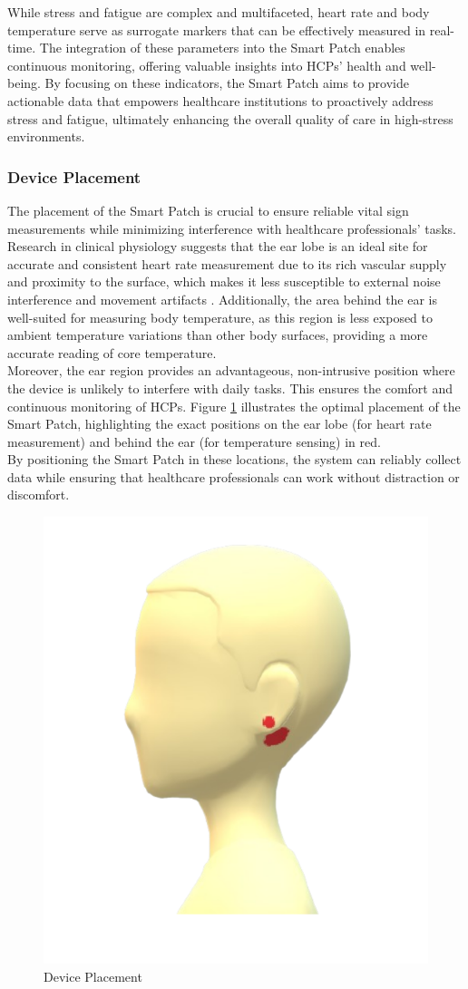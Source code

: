  \noindent While stress and fatigue are complex and multifaceted, heart rate and body temperature serve as surrogate markers that can be effectively measured in real-time. The integration of these parameters into the Smart Patch enables continuous monitoring, offering valuable insights into HCPs’ health and well-being. By focusing on these indicators, the Smart Patch aims to provide actionable data that empowers healthcare institutions to proactively address stress and fatigue, ultimately enhancing the overall quality of care in high-stress environments.
 
 \subsubsection{Device Placement}
The placement of the Smart Patch is crucial to ensure reliable vital sign measurements while minimizing interference with healthcare professionals' tasks. Research in clinical physiology suggests that the ear lobe is an ideal site for accurate and consistent heart rate measurement due to its rich vascular supply and proximity to the surface, which makes it less susceptible to external noise interference and movement artifacts . Additionally, the area behind the ear is well-suited for measuring body temperature, as this region is less exposed to ambient temperature variations than other body surfaces, providing a more accurate reading of core temperature.\\

\noindent Moreover, the ear region provides an advantageous, non-intrusive position where the device is unlikely to interfere with daily tasks. This ensures the comfort and continuous monitoring of HCPs. Figure \ref{fig:device-placement} illustrates the optimal placement of the Smart Patch, highlighting the exact positions on the ear lobe (for heart rate measurement) and behind the ear (for temperature sensing) in red.\\

\noindent By positioning the Smart Patch in these locations, the system can reliably collect data while ensuring that healthcare professionals can work without distraction or discomfort.

 \begin{figure}[h!]
     \centering
     \includegraphics[width=0.3\linewidth]{images/device-placement.png}
     \caption{Device Placement}
     \label{fig:device-placement}
 \end{figure}

